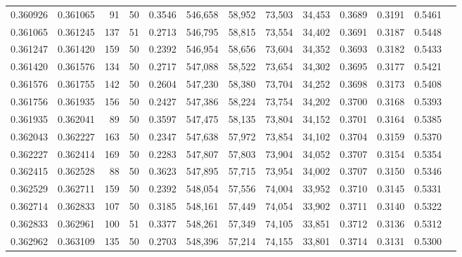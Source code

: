 \begin{tabular}{rrrrrrrrrrrrr}
0.360926 & 0.361065 &    91 &  50 &                                     0.3546 & 546,658 &  58,952 &  73,503 &  34,453 & 0.3689 & 0.3191 & 0.5461 \\
0.361065 & 0.361245 &   137 &  51 &                                     0.2713 & 546,795 &  58,815 &  73,554 &  34,402 & 0.3691 & 0.3187 & 0.5448 \\
0.361247 & 0.361420 &   159 &  50 &                                     0.2392 & 546,954 &  58,656 &  73,604 &  34,352 & 0.3693 & 0.3182 & 0.5433 \\
0.361420 & 0.361576 &   134 &  50 &                                     0.2717 & 547,088 &  58,522 &  73,654 &  34,302 & 0.3695 & 0.3177 & 0.5421 \\
0.361576 & 0.361755 &   142 &  50 &                                     0.2604 & 547,230 &  58,380 &  73,704 &  34,252 & 0.3698 & 0.3173 & 0.5408 \\
0.361756 & 0.361935 &   156 &  50 &                                     0.2427 & 547,386 &  58,224 &  73,754 &  34,202 & 0.3700 & 0.3168 & 0.5393 \\
0.361935 & 0.362041 &    89 &  50 &                                     0.3597 & 547,475 &  58,135 &  73,804 &  34,152 & 0.3701 & 0.3164 & 0.5385 \\
0.362043 & 0.362227 &   163 &  50 &                                     0.2347 & 547,638 &  57,972 &  73,854 &  34,102 & 0.3704 & 0.3159 & 0.5370 \\
0.362227 & 0.362414 &   169 &  50 &                                     0.2283 & 547,807 &  57,803 &  73,904 &  34,052 & 0.3707 & 0.3154 & 0.5354 \\
0.362415 & 0.362528 &    88 &  50 &                                     0.3623 & 547,895 &  57,715 &  73,954 &  34,002 & 0.3707 & 0.3150 & 0.5346 \\
0.362529 & 0.362711 &   159 &  50 &                                     0.2392 & 548,054 &  57,556 &  74,004 &  33,952 & 0.3710 & 0.3145 & 0.5331 \\
0.362714 & 0.362833 &   107 &  50 &                                     0.3185 & 548,161 &  57,449 &  74,054 &  33,902 & 0.3711 & 0.3140 & 0.5322 \\
0.362833 & 0.362961 &   100 &  51 &                                     0.3377 & 548,261 &  57,349 &  74,105 &  33,851 & 0.3712 & 0.3136 & 0.5312 \\
0.362962 & 0.363109 &   135 &  50 &                                     0.2703 & 548,396 &  57,214 &  74,155 &  33,801 & 0.3714 & 0.3131 & 0.5300 \\

\end{tabular}
